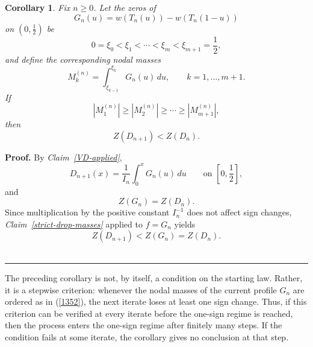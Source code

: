 \documentclass[onecolumn]{article}
\newtheorem{corollary}[theorem]{Corollary}
\newenvironment{proof}[1][Proof]{\noindent\textbf{#1.} }{\ \rule{0.5em}{0.5em}}
\begin{document}
\begin{corollary}
\label{strict-drop-iterates} Fix $n\geq 0$. Let the zeros of 
\begin{equation}
G_{n}(u)=w(T_{n}(u))-w(T_{n}(1-u))  \label{1354}
\end{equation}%
on $(0,\tfrac{1}{2})$ be 
\begin{equation}
0=\xi _{0}<\xi _{1}<\cdots <\xi _{m}<\xi _{m+1}=\frac{1}{2},  \label{1355}
\end{equation}%
and define the corresponding nodal masses 
\begin{equation}
M_{k}^{(n)}=\int_{\xi _{k-1}}^{\xi _{k}}G_{n}(u)\,du,\qquad k=1,\dots ,m+1.
\label{1356}
\end{equation}%
If 
\begin{equation}
|M_{1}^{(n)}|\geq |M_{2}^{(n)}|\geq \cdots \geq |M_{m+1}^{(n)}|,
\label{1357}
\end{equation}%
then 
\begin{equation}
Z(D_{n+1})<Z(D_{n}).  \label{1358}
\end{equation}
\end{corollary}

\begin{proof}
By \textit{Claim~\ref{VD-applied}}, 
\begin{equation}
D_{n+1}(x)=\frac{1}{I_{n}}\int_{0}^{x}G_{n}(u)\,du\qquad \text{on }\left[ 0,%
\frac{1}{2}\right] ,  \label{1359}
\end{equation}%
and 
\begin{equation}
Z(G_{n})=Z(D_{n}).  \label{1360}
\end{equation}%
Since multiplication by the positive constant $I_{n}^{-1}$ does not affect
sign changes, \textit{Claim~\ref{strict-drop-masses}} applied to $f=G_{n}$
yields 
\begin{equation}
Z(D_{n+1})<Z(G_{n})=Z(D_{n}).  \label{1361}
\end{equation}
\end{proof}

The preceding corollary is not, by itself, a condition on the starting law.
Rather, it is a stepwise criterion: whenever the nodal masses of the current
profile $G_{n}$ are ordered as in (\ref{1352}), the next iterate loses at
least one sign change. Thus, if this criterion can be verified at every
iterate before the one-sign regime is reached, then the process enters the
one-sign regime after finitely many steps. If the condition fails at some
iterate, the corollary gives no conclusion at that step.\hfill
\end{document}
